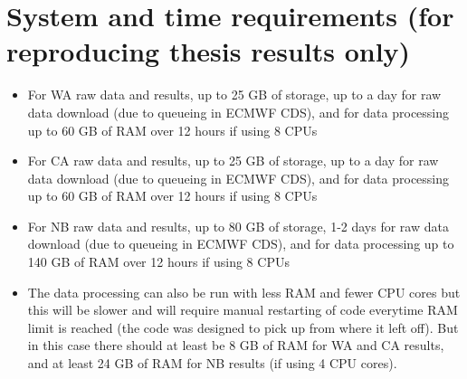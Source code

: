 \section[System and time requirements]{System and time requirements (for reproducing thesis results only)}
\begin{itemize}
	\item For \acf{WA} raw data and results, up to 25 GB of storage, up to a day for raw data download (due to queueing in \ac{ECMWF} \ac{CDS}), and for data processing up to 60 GB of RAM over 12 hours if using 8 CPUs
	\item For \acf{CA} raw data and results, up to 25 GB of storage, up to a day for raw data download (due to queueing in \ac{ECMWF} \ac{CDS}), and for data processing up to 60 GB of RAM over 12 hours if using 8 CPUs
	\item For \acf{NB} raw data and results, up to 80 GB of storage, 1-2 days for raw data download (due to queueing in \ac{ECMWF} \ac{CDS}), and for data processing up to 140 GB of RAM over 12 hours if using 8 CPUs
	\item The data processing can also be run with less RAM and fewer CPU cores but this will be slower and will require manual restarting of code everytime RAM limit is reached (the code was designed to pick up from where it left off). But in this case there should at least be 8 GB of RAM for \ac{WA} and \ac{CA} results, and at least 24 GB of RAM for \ac{NB} results (if using 4 CPU cores).
\end{itemize}
